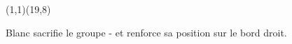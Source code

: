 \documentclass[preview, border=0pt, varwidth=false]{standalone}
\begin{document}
	\setgounit{0.5cm} 
	
	\parbox[c][14.65cm][c]{10.2cm}{
		\centering
		
		\begin{psgopartialboard}{(1,1)(19,8)}
			\pass
		\end{psgopartialboard}
		
		\vspace{1em}
		Blanc sacrifie le groupe  -  et renforce sa position sur le bord droit.
	}
	
\end{document}
